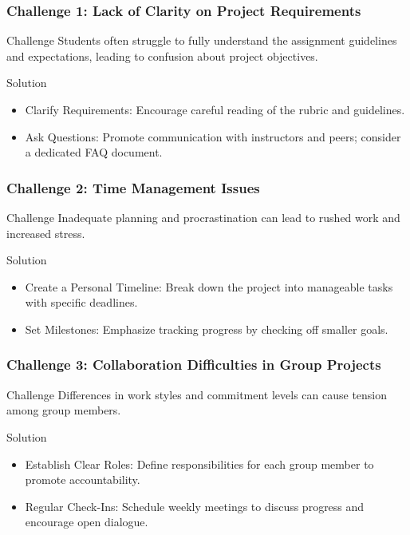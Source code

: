 \documentclass[aspectratio=169]{beamer}
\begin{document}
\begin{frame}[fragile]
    \frametitle{Challenge 1: Lack of Clarity on Project Requirements}
    \begin{block}{Challenge}
        Students often struggle to fully understand the assignment guidelines and expectations, leading to confusion about project objectives.
    \end{block}
    \begin{block}{Solution}
        \begin{itemize}
            \item Clarify Requirements: Encourage careful reading of the rubric and guidelines.
            \item Ask Questions: Promote communication with instructors and peers; consider a dedicated FAQ document.
        \end{itemize}
    \end{block}
\end{frame}

\begin{frame}[fragile]
    \frametitle{Challenge 2: Time Management Issues}
    \begin{block}{Challenge}
        Inadequate planning and procrastination can lead to rushed work and increased stress.
    \end{block}
    \begin{block}{Solution}
        \begin{itemize}
            \item Create a Personal Timeline: Break down the project into manageable tasks with specific deadlines.
            \item Set Milestones: Emphasize tracking progress by checking off smaller goals.
        \end{itemize}
    \end{block}
\end{frame}

\begin{frame}[fragile]
    \frametitle{Challenge 3: Collaboration Difficulties in Group Projects}
    \begin{block}{Challenge}
        Differences in work styles and commitment levels can cause tension among group members.
    \end{block}
    \begin{block}{Solution}
        \begin{itemize}
            \item Establish Clear Roles: Define responsibilities for each group member to promote accountability.
            \item Regular Check-Ins: Schedule weekly meetings to discuss progress and encourage open dialogue.
        \end{itemize}
    \end{block}
\end{frame}
\end{document}
